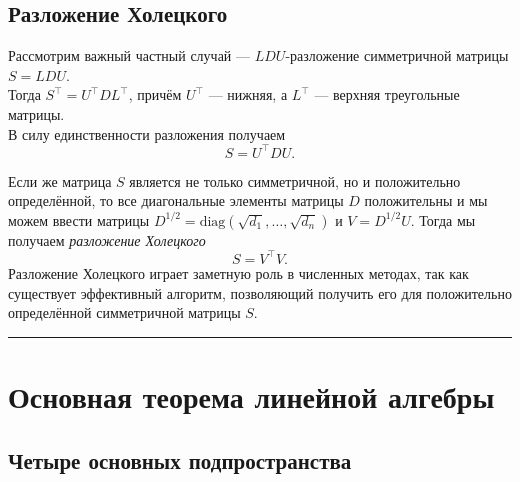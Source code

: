 \documentclass[11pt,a4paper]{article}
\begin{document}
    \hypertarget{ux440ux430ux437ux43bux43eux436ux435ux43dux438ux435-ux445ux43eux43bux435ux446ux43aux43eux433ux43e}{%
\subsection{Разложение
Холецкого}\label{ux440ux430ux437ux43bux43eux436ux435ux43dux438ux435-ux445ux43eux43bux435ux446ux43aux43eux433ux43e}}

Рассмотрим важный частный случай --- \(LDU\)-разложение симметричной
матрицы \(S = LDU\).\\
Тогда \(S^\top = U^\top D L^\top\), причём \(U^\top\) --- нижняя, а
\(L^\top\) --- верхняя треугольные матрицы.\\
В силу единственности разложения получаем \[ S = U^\top D U. \]

Если же матрица \(S\) является не только симметричной, но и положительно
определённой, то все диагональные элементы матрицы \(D\) положительны и
мы можем ввести матрицы
\(D^{1/2} = \mathrm{diag}\left(\sqrt{d_1}, \dots, \sqrt{d_n}\right)\) и
\(V = D^{1/2}U\). Тогда мы получаем \emph{разложение Холецкого} \[
  S = V^\top V.
\] Разложение Холецкого играет заметную роль в численных методах, так
как существует эффективный алгоритм, позволяющий получить его для
положительно определённой симметричной матрицы \(S\).

    \begin{center}\rule{0.5\linewidth}{0.5pt}\end{center}

    \hypertarget{ux43eux441ux43dux43eux432ux43dux430ux44f-ux442ux435ux43eux440ux435ux43cux430-ux43bux438ux43dux435ux439ux43dux43eux439-ux430ux43bux433ux435ux431ux440ux44b}{%
\section{Основная теорема линейной
алгебры}\label{ux43eux441ux43dux43eux432ux43dux430ux44f-ux442ux435ux43eux440ux435ux43cux430-ux43bux438ux43dux435ux439ux43dux43eux439-ux430ux43bux433ux435ux431ux440ux44b}}

\hypertarget{ux447ux435ux442ux44bux440ux435-ux43eux441ux43dux43eux432ux43dux44bux445-ux43fux43eux434ux43fux440ux43eux441ux442ux440ux430ux43dux441ux442ux432ux430}{%
\subsection{Четыре основных
подпространства}\label{ux447ux435ux442ux44bux440ux435-ux43eux441ux43dux43eux432ux43dux44bux445-ux43fux43eux434ux43fux440ux43eux441ux442ux440ux430ux43dux441ux442ux432ux430}}
\end{document}
